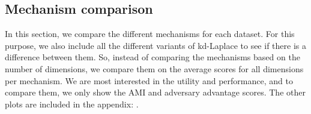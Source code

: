 \newpage
\subsection{Mechanism comparison}
In this section, we compare the different mechanisms for each dataset.
For this purpose, we also include all the different variants of kd-Laplace to see if there is a difference between them.
So, instead of comparing the mechanisms based on the number of dimensions, we compare them on the average scores for all dimensions per mechanism.
We are most interested in the utility and performance, and to compare them, we only show the AMI and adversary advantage scores.
The other plots are included in the appendix: .

\begin{figure}[H]

\end{figure}
